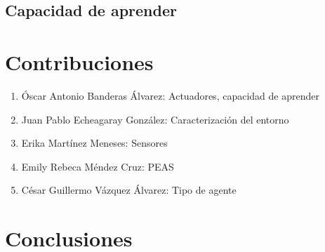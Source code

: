 \documentclass{article}
\begin{document}
        \subsection{Capacidad de aprender}

    \section{Contribuciones}
        \begin{enumerate}
            \item Óscar Antonio Banderas Álvarez: Actuadores, capacidad de aprender
            \item Juan Pablo Echeagaray González: Caracterización del entorno
            \item Erika Martínez Meneses: Sensores
            \item Emily Rebeca Méndez Cruz: PEAS
            \item César Guillermo Vázquez Álvarez: Tipo de agente
        \end{enumerate}

    \section{Conclusiones}

    \nocite{*}
    \printbibliography
\end{document}
